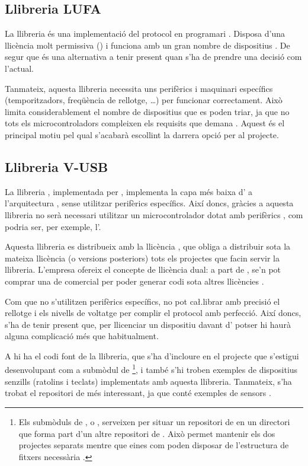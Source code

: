 \subsection{Llibreria LUFA}

La llibreria  és una implementació del protocol  en
programari \cite{Lufa}. Disposa d'una llicència molt permissiva () i
funciona amb un gran nombre de dispositius . De segur que és una
alternativa a tenir present quan s'ha de prendre una decisió com l'actual.

Tanmateix, aquesta llibreria necessita uns perifèrics i maquinari específics
(temporitzadors, freqüència de rellotge, \dots) per funcionar correctament.
Això limita considerablement el nombre de dispositius que es poden triar, ja que
no tots els microcontroladors  compleixen els requisits que
demana . Aquest és el principal motiu pel qual s'acabarà escollint la
darrera opció per al projecte.

\subsection{Llibreria V-USB}

La llibreria , implementada per  \cite{Vusb},
implementa la capa més baixa d' a l'arquitectura
, sense utilitzar perifèrics específics. Així doncs, gràcies a aquesta
llibreria no serà necessari utilitzar un microcontrolador  dotat amb
perifèrics , com podria ser, per exemple, l'.

Aquesta llibreria 
es distribueix amb la llicència , que obliga a
distribuir sota la mateixa llicència (o versions posteriors) tots els
projectes que facin servir la llibreria. L'empresa ofereix el concepte de
llicència dual: a part de , se'n pot comprar una de comercial
per poder generar codi sota altres llicències \cite{VusbLicensing}.

Com que no s'utilitzen perifèrics específics,  no pot ca\l.librar amb
precisió el rellotge i els nivells de voltatge per complir el protocol 
amb perfecció. Així doncs, s'ha de tenir present que, per llicenciar un
dispositiu davant d' potser hi haurà alguna complicació més que
habitualment.

A \cite{Vusb} hi ha el codi font de la llibreria, que s'ha d'incloure en el
projecte que s'estigui desenvolupant com a submòdul de 
\footnote{
    Els submòduls de , o , serveixen per
    situar un repositori de  en un directori que forma part d'un altre
    repositori de . Això permet mantenir els dos projectes separats
    mentre que eines com  poden disposar de l'estructura de
    fitxers necessària \cite{GitSubmodule}.
}, i també s'hi troben exemples de dispositius
senzills (ratolins i teclats) implementats amb aquesta llibreria. Tanmateix,
s'ha trobat el repositori de \cite{VusbProjects} més interessant, ja que conté
exemples de sensors .

